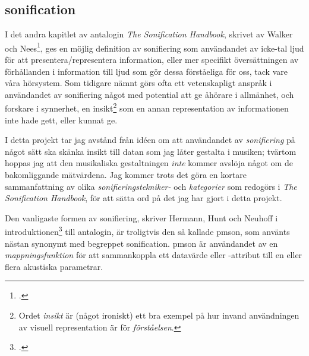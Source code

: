\documentclass[11pt, a4paper]{article} %
\begin{document}



\subsection*{\gls{sonification}}

I det andra kapitlet av antalogin \emph{The Sonification Handbook}, skrivet av Walker och Nees\footcite[9]{hermann_theory_2011}, ges en möjlig definition av sonifiering som användandet av icke-tal ljud för att presentera/representera information, eller mer specifikt översättningen av förhållanden i information till ljud som gör dessa förståeliga för oss, tack vare våra hörsystem. Som tidigare nämnt görs ofta ett vetenskapligt anspråk i användandet av sonifiering något med potential att ge åhörare i allmänhet, och forskare i synnerhet, en insikt\footnote{Ordet \emph{insikt} är (något ironiskt) ett bra exempel på hur invand användningen av visuell representation är för \emph{förståelsen}.} som en annan representation av informationen inte hade gett, eller kunnat ge.  

I detta projekt tar jag avstånd från idéen om att användandet av \emph{sonifiering} på något sätt ska skänka insikt till datan som jag låter gestalta i musiken; tvärtom hoppas jag att den musikaliska gestaltningen \emph{inte} kommer avslöja något om de bakomliggande mätvärdena. Jag kommer trots det göra en kortare sammanfattning av olika \emph{sonifieringstekniker- } och \emph{kategorier} som redogörs i \emph{The Sonification Handbook}, för att sätta ord på det jag har gjort i detta projekt.%

Den vanligaste formen av sonifiering, skriver Hermann, Hunt och Neuhoff i introduktionen\footcite[5]{hermann_introduction_2011} till antalogin, är troligtvis den så kallade \gls{pmson}, som använts nästan synonymt med begreppet \gls{sonification}. \gls{pmson} är användandet av en \emph{mappningsfunktion} för att sammankoppla ett datavärde eller -attribut till en eller flera akustiska parametrar.
\end{document}
